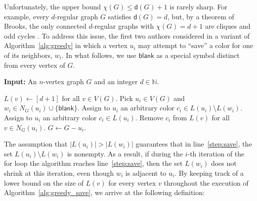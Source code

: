 \documentclass[11pt]{article}
\theoremstyle{slantthm}
\numberwithin{equation}{section}
\theoremstyle{definition}
\renewcommand{\leq}{\leqslant}
\renewcommand{\geq}{\geqslant}
\numberwithin{equation}{section}
\newcommand{\N}{\mathbb{N}}
\newcommand{\0}{\varnothing}
\newcommand{\set}[1]{\{#1\}}
\newcommand{\de}{\mathsf{d}}
\newcommand{\blank}{\mathsf{blank}}
\begin{document}
    Unfortunately, the upper bound $\chi(G) \leq \de(G) + 1$ is rarely sharp. For example, every $d$-regular graph $G$ satisfies $\de(G) = d$, but, by a theorem of Brooks, the only connected $d$-regular graphs with $\chi(G) = d + 1$ are cliques and odd cycles \cites{Brooks}[Theorem~5.2.4]{Diestel}. To address this issue, the first two authors considered in \cite{WD} a variant of Algorithm~\ref{alg:greedy} in which a vertex $u_i$ may attempt to ``save'' a color for one of its neighbors, $w_i$. In what follows, we use $\blank$ as a special symbol distinct from every vertex of $G$.

    \begin{algorithm}[h]%
    \caption{Greedy coloring with savings}\label{alg:greedy_save}
    \begin{algorithmic}[1]
        \medskip
    
        \Statex \textbf{Input:} An $n$-vertex graph $G$ and an integer $d \in \N$.

        \medskip
        
        \State $L(v) \gets [d+1]$ for all $v \in V(G)$.
            \State Pick $u_i \in V(G)$ and $w_i \in N_G(u_i) \cup \set{\blank}$.
            \If{$w_i \neq \blank$ and $|L(u_i)| > |L(w_i)|$}
                \State Assign to $u_i$ an arbitrary color $c_i \in L(u_i) \setminus L(w_i)$. \label{step:save}
            \Else
                \State Assign to $u_i$ an arbitrary color $c_i \in L(u_i)$.
            \EndIf
            \State Remove $c_i$ from $L(v)$ for all $v \in N_G(u_i)$.
            \State $G \gets G - u_i$.
        \EndFor
    \end{algorithmic}
    \end{algorithm}
    
    \noindent The assumption that $|L(u_i)| > |L(w_i)|$ guarantees that in line~\ref{step:save}, the set $L(u_i) \setminus L(w_i)$ is nonempty. As a result, if during the $i$-th iteration of the \textsf{for} loop the algorithm reaches line~\ref{step:save}, then the set $L(w_i)$ does not shrink at this iteration, even though $w_i$ is adjacent to $u_i$. By keeping track of a lower bound on the size of $L(v)$ for every vertex $v$ throughout the execution of Algorithm~\ref{alg:greedy_save}, we arrive at the following definition:
\end{document}
